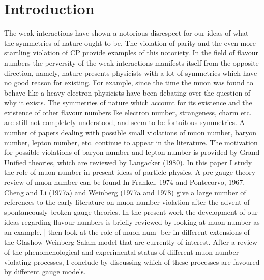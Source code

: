 \documentclass[twoside]{article}
\begin{document}
\section{Introduction}
The weak interactions have shown a notorious disrespect for our
ideas of what the symmetries of nature ought to be. The violation of
parity and the even more startling violation of CP provide examples of
this notoriety. In the field of flavour numbers the perversity of the
weak interactions manifests itself from the opposite direction, namely,
nature presents physicists with a lot of symmetries which have no good
reason for existing. For example, since the time the muon was found to
behave like a heavy electron physicists have been debating over the question of why it exists. The symmetries of nature which account for its
existence and the existence of other flavour numbers lke electron
number, strangeness, charm etc. are still not completely understood,
and seem to be fortuitous symmetries. A number of papers dealing with
possible small violations of muon number, baryon number, lepton number,
etc. continue to appear in the literature. The motivation for possible
violations of baryon number and lepton number is provided by Grand
Unified theories, which are reviewed by Langacker (1980). In this paper
I study the role of muon number in present ideas of particle physics.
A pre-gauge theory review of muon number can be found In Frankel, 1974 and
Pontecorvo, 1967. Cheng and Li (1977a) and Weinberg (1977a and 1978) give a
large number of references to the early literature on muon number violation
after the advent of spontaneously broken gauge theories. In the present work
the development of our ideas regarding flavour numbers is briefly reviewed by
looking at muon number as an example. | then look at the role of muon num-
ber in different extensions of the Glashow-Weinberg-Salam model that are currently of interest. After a review of the phenomenological and experimental
status of different muon number violating processes, I conclude by discussing which of these processes are favoured by different gauge models.
\end{document}
